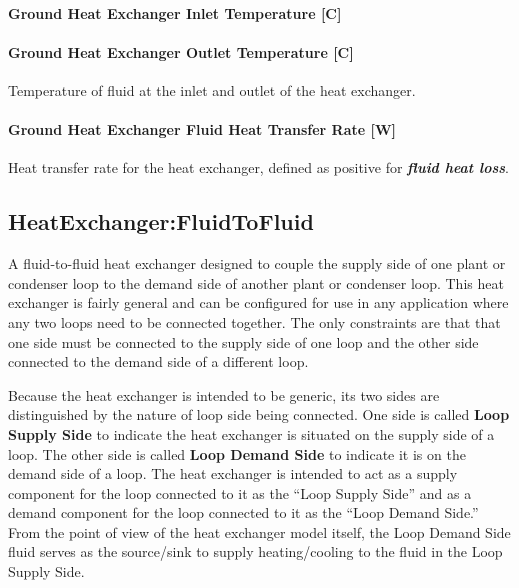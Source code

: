 \paragraph{Ground Heat Exchanger Inlet Temperature {[}C{]}}\label{ground-heat-exchanger-inlet-temperature-c-3}

\paragraph{Ground Heat Exchanger Outlet Temperature {[}C{]}}\label{ground-heat-exchanger-outlet-temperature-c-3}

Temperature of fluid at the inlet and outlet of the heat exchanger.

\paragraph{Ground Heat Exchanger Fluid Heat Transfer Rate {[}W{]}}\label{ground-heat-exchanger-fluid-heat-transfer-rate-w}

Heat transfer rate for the heat exchanger, defined as positive for \textbf{\emph{fluid heat loss}}.

\subsection{HeatExchanger:FluidToFluid}\label{heatexchangerfluidtofluid}

A fluid-to-fluid heat exchanger designed to couple the supply side of one plant or condenser loop to the demand side of another plant or condenser loop.
This heat exchanger is fairly general and can be configured for use in any application where any two loops need to be connected together.
The only constraints are that that one side must be connected to the supply side of one loop and the other side connected to the demand side of a different loop.

Because the heat exchanger is intended to be generic, its two sides are distinguished by the nature of loop side being connected.
One side is called \textbf{Loop Supply Side} to indicate the heat exchanger is situated on the supply side of a loop.
The other side is called \textbf{Loop Demand Side} to indicate it is on the demand side of a loop.
The heat exchanger is intended to act as a supply component for the loop connected to it as the ``Loop Supply Side''
and as a demand component for the loop connected to it as the ``Loop Demand Side.''
From the point of view of the heat exchanger model itself, the Loop Demand Side fluid serves as the source/sink to supply heating/cooling to the fluid in the Loop Supply Side.

